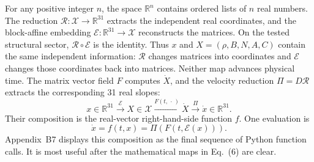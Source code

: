 \documentclass[10pt,letterpaper,twocolumn]{article}
\newcommand{\R}{\mathbb R}
\begin{document}
For any positive integer \(n\), the space \(\R^n\) contains ordered lists of
\(n\) real numbers.  The reduction \(\mathcal R:\mathcal X\to\R^{31}\)
extracts the independent real coordinates, and the block-affine embedding
\(\mathcal E:\R^{31}\to\mathcal X\) reconstructs the matrices.  On the
tested structural sector, \(\mathcal R\circ\mathcal E\) is the identity.
Thus \(x\) and \(X=(\rho,B,N,A,C)\) contain the same independent information:
\(\mathcal R\) changes matrices into coordinates and \(\mathcal E\) changes
those coordinates back into matrices.  Neither map advances physical time.
The matrix vector field \(F\) computes \(\dot X\), and the velocity reduction
\(\Pi=D\mathcal R\) extracts the corresponding 31 real slopes:
\[
x\in\R^{31}
\xrightarrow{\mathcal E}
X\in\mathcal X
\xrightarrow{F(t,\,\cdot\,)}
\dot X
\xrightarrow{\Pi}
\dot x\in\R^{31}.
\tag{5}
\]
Their composition is the real-vector right-hand-side function \(f\).  One
evaluation is
\[
\boxed{\dot x=f(t,x)=\Pi\!\left(F\!\left(t,\mathcal E(x)\right)\right)}.
\tag{6}
\]
Appendix~B7 displays this composition as the final sequence of Python function
calls.  It is most useful after the mathematical maps in Eq.~(6) are clear.
\end{document}
